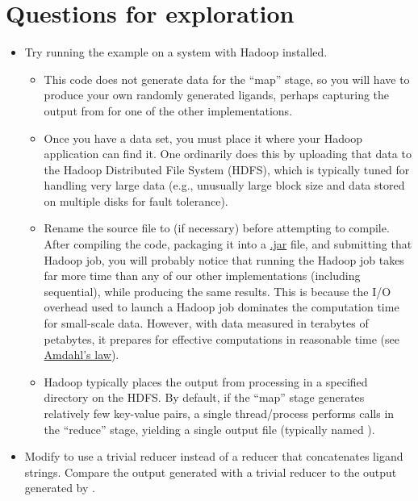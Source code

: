 \documentclass[letterpaper,10pt,openany,oneside]{sphinxmanual}
\begin{document}
\section{Questions for exploration}
\label{hadoop/hadoop:questions-for-exploration}\begin{itemize}
\item {} 
Try running the example  on a system with Hadoop installed.
\begin{itemize}
\item {} 
This code does not generate data for the “map” stage, so you will have to produce your own randomly generated ligands, perhaps capturing the output from  for one of the other implementations.

\item {} 
Once you have a data set, you must place it where your Hadoop application can find it.  One ordinarily does this by uploading that data to the Hadoop Distributed File System (HDFS), which is typically tuned for handling very large data (e.g., unusually large block size and data stored on multiple disks for fault tolerance).

\item {} 
Rename the source file to  (if necessary) before attempting to compile. After compiling the code, packaging it into a \href{http://en.wikipedia.org/wiki/JAR\_(file\_format)}{.jar} file, and submitting that Hadoop job, you will probably notice that running the Hadoop job takes far more time than any of our other implementations (including sequential), while producing the same results. This is because the I/O overhead used to launch a Hadoop job dominates the computation time for small-scale data. However, with data measured in terabytes of petabytes, it prepares for effective computations in reasonable time (see \href{http://home.wlu.edu/~whaleyt/classes/parallel/topics/amdahl.html}{Amdahl's law}).

\item {} 
Hadoop typically places the output from processing in a specified directory on the HDFS. By default, if the “map” stage generates relatively few key-value pairs, a single thread/process performs  calls in the “reduce” stage, yielding a single output file (typically named ).

\end{itemize}

\item {} 
Modify  to use a trivial reducer instead of a reducer that concatenates ligand strings. Compare the output generated with a trivial reducer to the output generated by .


\end{itemize}
\end{document}
